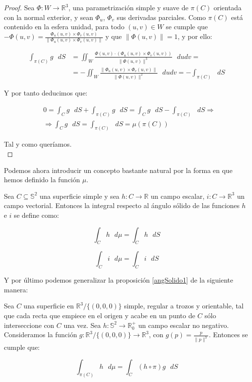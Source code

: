 \begin{proof}
Sea $\Phi :W\rightarrow \mathds{R}^3$, una parametrización simple y suave de $\pi (C)$ orientada con la normal exterior, y sean $\Phi _u$, $\Phi _v$ sus derivadas parciales. Como $\pi (C)$ está contenido en la esfera unidad, para todo $(u,v)\in W$ se cumple que $-\Phi(u,v) = \frac{\Phi_u(u,v)\times \Phi_v (u,v)}{\|\Phi_u(u,v)\times \Phi_v (u,v)\|}$ y que  $\|\Phi(u,v)\| = 1$, y por ello:

\begin{align*}
  \int _{\pi(C)}g\text{ } dS &= \iint _{W} \frac{\Phi(u,v) \cdot (\Phi_u(u,v)\times \Phi_v (u,v))}{\|\Phi(u,v)\|^3}\text{ } du dv =\\
  &= - \iint _{W} \frac{\|\Phi_u(u,v)\times \Phi_v (u,v)\|}{\|\Phi(u,v)\|^2}\text{ } du dv = - \int _{\pi(C)}\text{ } dS
\end{align*}

Y por tanto deducimos que:

\begin{align*}
  & 0 = \int _{C}g\text{ } dS + \int _{\pi(C)}g\text{ } dS = \int _{C}g\text{ } dS - \int _{\pi(C)}\text{ } dS \Rightarrow \\
  & \Rightarrow \int _{C}g\text{ } dS = \int _{\pi(C)}\text{ } dS = \mu (\pi(C))
\end{align*}

Tal y como queríamos.\\
\end{proof}

Podemos ahora introducir un concepto bastante natural por la forma en que hemos definido la función $\mu$.

\begin{definicion}
  Sea $C\subseteq \mathds{S}^2$ una superficie simple y sea $h: C\rightarrow \mathds{R}$ un campo escalar, $i: C\rightarrow \mathds{R}^3$ un campo vectorial. Entonces la integral respecto al ángulo sólido de las funciones $h$ e $i$ se define como:

  $$\int _C h\text{ } d\mu = \int _C h\text{ } dS$$

   $$\int _C i\text{ } d\mu = \int _C i\text{ } dS$$
  
\end{definicion}

Y por último podemos generalizar la proposición \ref{angSolido1} de la siguiente manera:

\begin{proposicion}\label{ToArea}
Sea $C$ una superficie en $\mathds{R}^3/\{(0,0,0)\}$ simple, regular a trozos y orientable, tal que cada recta que empiece en el origen y acabe en un punto de $C$ sólo interseccione con $C$ una vez. Sea $h: \mathds{S}^2\rightarrow \mathds{R}^+_0$ un campo escalar no negativo. Consideramos la función $g:\mathds{R}^3/\{(0,0,0)\} \rightarrow \mathds{R}^3$, con $g(p)=\frac{p}{\|p\|^3}$. Entonces se cumple que:

 \begin{equation}\label{transfToArea}
   \int_{\pi(C)} h\text{ }d\mu = \int _C (h\circ \pi) g \text{ }dS 
 \end{equation}
 
  \end{proposicion}

